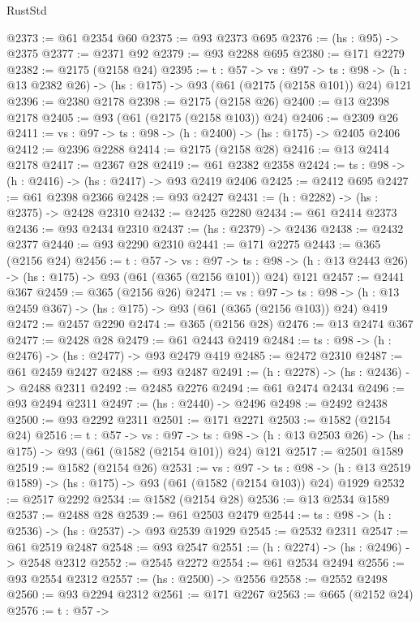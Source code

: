 \begin{lexlean}{RustStd}
\begin{coremodule}
@2373 := @61 @2354 @60
@2375 := @93 @2373 @695
@2376 := (hs : @95) -> @2375
@2377 := @2371 @92
@2379 := @93 @2288 @695
@2380 := @171 @2279
@2382 := @2175 (@2158 @24)
@2395 := {t : @57} ->
  {vs : @97} ->
  {ts : @98} -> (h : @13 @2382 @26) -> (hs : @175) -> @93 (@61 (@2175 (@2158 @101)) @24) @121
@2396 := @2380 @2178
@2398 := @2175 (@2158 @26)
@2400 := @13 @2398 @2178
@2405 := @93 (@61 (@2175 (@2158 @103)) @24)
@2406 := @2309 @26
@2411 := {vs : @97} -> {ts : @98} -> (h : @2400) -> (hs : @175) -> @2405 @2406
@2412 := @2396 @2288
@2414 := @2175 (@2158 @28)
@2416 := @13 @2414 @2178
@2417 := @2367 @28
@2419 := @61 @2382 @2358
@2424 := {ts : @98} -> (h : @2416) -> (hs : @2417) -> @93 @2419 @2406
@2425 := @2412 @695
@2427 := @61 @2398 @2366
@2428 := @93 @2427
@2431 := (h : @2282) -> (hs : @2375) -> @2428 @2310
@2432 := @2425 @2280
@2434 := @61 @2414 @2373
@2436 := @93 @2434 @2310
@2437 := (hs : @2379) -> @2436
@2438 := @2432 @2377
@2440 := @93 @2290 @2310
@2441 := @171 @2275
@2443 := @365 (@2156 @24)
@2456 := {t : @57} ->
  {vs : @97} ->
  {ts : @98} -> (h : @13 @2443 @26) -> (hs : @175) -> @93 (@61 (@365 (@2156 @101)) @24) @121
@2457 := @2441 @367
@2459 := @365 (@2156 @26)
@2471 := {vs : @97} ->
  {ts : @98} -> (h : @13 @2459 @367) -> (hs : @175) -> @93 (@61 (@365 (@2156 @103)) @24) @419
@2472 := @2457 @2290
@2474 := @365 (@2156 @28)
@2476 := @13 @2474 @367
@2477 := @2428 @28
@2479 := @61 @2443 @2419
@2484 := {ts : @98} -> (h : @2476) -> (hs : @2477) -> @93 @2479 @419
@2485 := @2472 @2310
@2487 := @61 @2459 @2427
@2488 := @93 @2487
@2491 := (h : @2278) -> (hs : @2436) -> @2488 @2311
@2492 := @2485 @2276
@2494 := @61 @2474 @2434
@2496 := @93 @2494 @2311
@2497 := (hs : @2440) -> @2496
@2498 := @2492 @2438
@2500 := @93 @2292 @2311
@2501 := @171 @2271
@2503 := @1582 (@2154 @24)
@2516 := {t : @57} ->
  {vs : @97} ->
  {ts : @98} -> (h : @13 @2503 @26) -> (hs : @175) -> @93 (@61 (@1582 (@2154 @101)) @24) @121
@2517 := @2501 @1589
@2519 := @1582 (@2154 @26)
@2531 := {vs : @97} ->
  {ts : @98} -> (h : @13 @2519 @1589) -> (hs : @175) -> @93 (@61 (@1582 (@2154 @103)) @24) @1929
@2532 := @2517 @2292
@2534 := @1582 (@2154 @28)
@2536 := @13 @2534 @1589
@2537 := @2488 @28
@2539 := @61 @2503 @2479
@2544 := {ts : @98} -> (h : @2536) -> (hs : @2537) -> @93 @2539 @1929
@2545 := @2532 @2311
@2547 := @61 @2519 @2487
@2548 := @93 @2547
@2551 := (h : @2274) -> (hs : @2496) -> @2548 @2312
@2552 := @2545 @2272
@2554 := @61 @2534 @2494
@2556 := @93 @2554 @2312
@2557 := (hs : @2500) -> @2556
@2558 := @2552 @2498
@2560 := @93 @2294 @2312
@2561 := @171 @2267
@2563 := @665 (@2152 @24)
@2576 := {t : @57} ->

\end{coremodule}
\end{lexlean}
